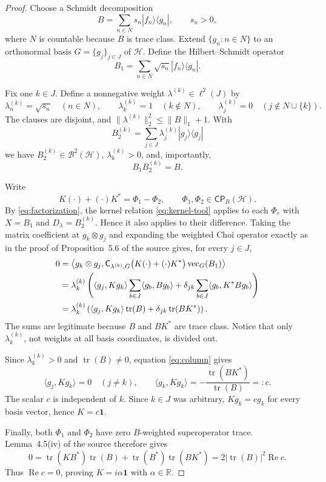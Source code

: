 \documentclass[11pt]{article}
\newcommand{\Hh}{\mathcal H}
\newcommand{\Bcal}{\mathcal B}
\newcommand{\CP}{\mathsf{CP}}
\newcommand{\tr}{\operatorname{tr}}
\newcommand{\id}{\mathbf 1}
\newcommand{\Cw}{\mathsf C}
\newcommand{\vecg}{\operatorname{vec}}
\begin{document}
\begin{proof}
Choose a Schmidt decomposition
\[
 B=\sum_{n\in N}s_n|f_n\rangle\langle g_n|,
 \qquad s_n>0,
\]
where $N$ is countable because $B$ is trace class.  Extend
$\{g_n:n\in N\}$ to an orthonormal basis
$G=\{g_j\}_{j\in J}$ of $\Hh$.  Define the Hilbert--Schmidt operator
\[
 B_1=\sum_{n\in N}\sqrt{s_n}|f_n\rangle\langle g_n|.
\]

Fix one $k\in J$.  Define a nonnegative weight
$\lambda^{(k)}\in\ell^2(J)$ by
\[
 \lambda^{(k)}_n=\sqrt{s_n}\quad(n\in N),\qquad
 \lambda^{(k)}_k=1\quad(k\notin N),\qquad
 \lambda^{(k)}_j=0\quad(j\notin N\cup\{k\}).
\]
The clauses are disjoint, and
$\|\lambda^{(k)}\|_2^2\leq\|B\|_1+1$.  With
\[
 B_2^{(k)}=\sum_{j\in J}\lambda^{(k)}_j
 |g_j\rangle\langle g_j|
\]
we have $B_2^{(k)}\in\Bcal^2(\Hh)$,
$\lambda^{(k)}_k>0$, and, importantly,
\begin{equation}\label{eq:factorization}
 B_1B_2^{(k)}=B.
\end{equation}

Write
\[
 K(\cdot)+(\cdot)K^*=\Phi_1-\Phi_2,
 \qquad \Phi_1,\Phi_2\in\CP_B(\Hh).
\]
By \eqref{eq:factorization}, the kernel relation
\eqref{eq:kernel-tool} applies to each $\Phi_r$ with $X=B_1$ and
$D_\lambda=B_2^{(k)}$.  Hence it also applies to their difference.  Taking
the matrix coefficient at $g_k\otimes g_j$ and expanding the weighted Choi
operator exactly as in the proof of Proposition~5.6 of the source gives, for
every $j\in J$,
\begin{align}
0&=\left\langle g_k\otimes g_j,
 \Cw_{\lambda^{(k)},G}\bigl(K(\cdot)+(\cdot)K^*\bigr)
 \vecg_G(B_1)\right\rangle \notag\\
&=\lambda^{(k)}_k\left(
 \langle g_j,Kg_k\rangle\sum_{b\in J}\langle g_b,Bg_b\rangle
 +\delta_{jk}\sum_{b\in J}\langle g_b,K^*Bg_b\rangle
 \right)\notag\\
&=\lambda^{(k)}_k\left(
 \langle g_j,Kg_k\rangle\tr(B)
 +\delta_{jk}\tr(BK^*)\right).
\label{eq:column}
\end{align}
The sums are legitimate because $B$ and $BK^*$ are trace class.  Notice that
only $\lambda^{(k)}_k$, not weights at all basis coordinates, is divided out.

Since $\lambda^{(k)}_k>0$ and $\tr(B)\ne0$, equation
\eqref{eq:column} gives
\[
 \langle g_j,Kg_k\rangle=0\quad(j\ne k),\qquad
 \langle g_k,Kg_k\rangle
 =-\frac{\tr(BK^*)}{\tr(B)}=:c.
\]
The scalar $c$ is independent of $k$.  Since $k\in J$ was arbitrary,
$Kg_k=cg_k$ for every basis vector, hence $K=c\id$.

Finally, both $\Phi_1$ and $\Phi_2$ have zero $B$-weighted superoperator
trace.  Lemma~4.5(iv) of the source therefore gives
\[
0=\tr(KB^*)\tr(B)+\tr(B^*)\tr(BK^*)
  =2|\tr(B)|^2\operatorname{Re}c.
\]
Thus $\operatorname{Re}c=0$, proving $K=i\alpha\id$ with
$\alpha\in\mathbb R$.
\end{proof}
\end{document}
